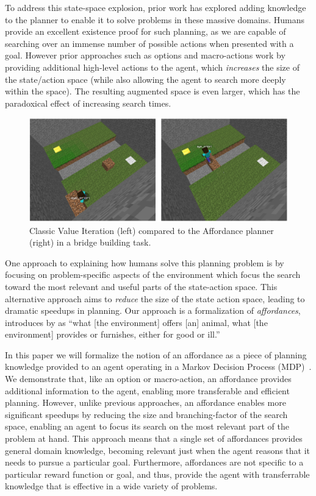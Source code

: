 \documentclass[]{article}
\begin{document}
To address this state-space explosion, prior work has explored adding
knowledge to the planner to enable it to solve problems in these
massive domains. Humans provide an excellent existence proof for such
planning, as we are capable of searching over an immense number of
possible actions when presented with a goal.  However prior approaches
such as options and macro-actions work by providing additional
high-level actions to the agent, which {\em increases} the size of the
state/action space (while also allowing the agent to search more
deeply within the space).  The resulting augmented space is even
larger, which has the paradoxical effect of increasing search times.

\begin{figure}
\centering
\includegraphics[scale =0.18]{figures/bridgeworld_vi_vs_aff.png}
  \caption{Classic Value Iteration (left) compared to the Affordance planner (right) in a bridge building task.}
  \label{fig:minecraft}
\end{figure}

One approach to explaining how humans solve this planning problem is
by focusing on problem-specific aspects of the environment which focus
the search toward the most relevant and useful parts of the
state-action space.  This alternative approach aims to {\em reduce}
the size of the state action space, leading to dramatic speedups in
planning.  Our approach is a formalization of {\em affordances},
introduces by \citet{gibson77} as ``what [the environment] offers [an]
animal, what [the environment] provides or furnishes, either for good
or ill.''  

In this paper we will formalize the notion of an affordance as a piece
of planning knowledge provided to an agent operating in a Markov
Decision Process (MDP)~\citep{kaelbling99}.  We demonstrate that, like
an option or macro-action, an affordance provides additional
information to the agent, enabling more transferable and efficient
planning.  However, unlike previous approaches, an affordance enables
more significant speedups by reducing the size and branching-factor of
the search space, enabling an agent to focus its search on the most
relevant part of the problem at hand.  This approach means that a
single set of affordances provides general domain knowledge, becoming
relevant just when the agent reasons that it needs to pursue a
particular goal.  Furthermore, affordances are not specific to a
particular reward function or goal, and thus, provide the agent with
transferrable knowledge that is effective in a wide variety of
problems.
\end{document}
